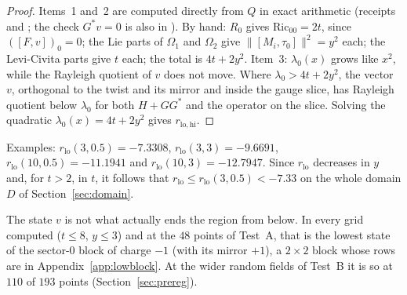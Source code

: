 \documentclass[11pt]{article}
\theoremstyle{definition}
\theoremstyle{remark}
\newcommand{\norm}[1]{\lVert #1\rVert}
\begin{document}
\begin{proof}
Items~1 and~2 are computed directly from $Q$ in exact arithmetic (receipts  and
; the check $G^*v=0$ is also in ). By
hand: $R_0$ gives $\mathrm{Ric}_{00}=2t$, since $([F,v])_0=0$; the Lie parts of $\Omega_1$ and $\Omega_2$ give
$\norm{[M_i,\tau_0]}^2=y^2$ each; the Levi-Civita parts give $t$ each; the total is $4t+2y^2$. Item~3:
$\lambda_0(x)$ grows like $x^2$, while the Rayleigh quotient of $v$ does not move. Where $\lambda_0>4t+2y^2$, the vector
$v$, orthogonal to the twist and its mirror and inside the gauge slice, has Rayleigh quotient below $\lambda_0$ for both
$H+GG^*$ and the operator on the slice. Solving the quadratic $\lambda_0(x)=4t+2y^2$ gives $r_{\mathrm{lo},\mathrm{hi}}$.
\end{proof}

Examples: $r_{\mathrm{lo}}(3,0.5)=-7.3308$, $r_{\mathrm{lo}}(3,3)=-9.6691$, $r_{\mathrm{lo}}(10,0.5)=-11.1941$ and
$r_{\mathrm{lo}}(10,3)=-12.7947$. Since $r_{\mathrm{lo}}$ decreases in $y$ and, for $t>2$, in $t$, it follows that
$r_{\mathrm{lo}}\le r_{\mathrm{lo}}(3,0.5)<-7.33$ on the whole domain $D$ of Section~\ref{sec:domain}.

The state $v$ is not what actually ends the region from below. In every grid computed ($t\le8$, $y\le3$) and at the
$48$ points of Test~A, that is the lowest state of
the sector-$0$ block of charge $-1$ (with its mirror $+1$), a $2\times2$ block whose rows are in
Appendix~\ref{app:lowblock}. At the wider random fields of Test~B it is so at $110$ of $193$ points
(Section~\ref{sec:prereg}).
\end{document}

